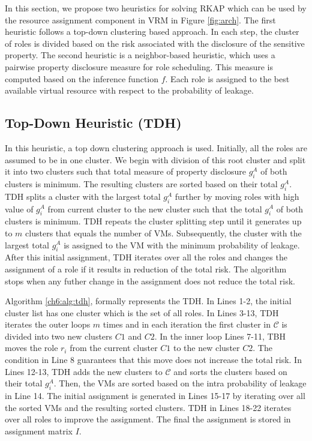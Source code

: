 In this section, we propose two heuristics for solving RKAP which can be used by the resource assignment component in VRM in Figure \ref{fig:arch}. The first heuristic follows a top-down clustering based approach. In each step, the cluster of roles is divided based on the risk associated with the disclosure of the sensitive property. The second heuristic is a neighbor-based heuristic, which uses a pairwise property disclosure measure for role scheduling. This measure is computed based on the inference function $f$. Each role is assigned to the best available virtual resource with respect to the probability of leakage.

\subsection{Top-Down Heuristic (TDH)}
In  this heuristic, a top down clustering approach is used. Initially, all the roles are assumed to be in one cluster. We begin with division of this root cluster and split it into two clusters such that total measure of property disclosure $g_i^A $ of both clusters is minimum. The resulting clusters are sorted based on their total $g_i^A$. TDH splits a cluster with the largest total $g_i^A$ further by moving roles with high value of $g_i^A$ from current cluster to the new cluster such that the total $g_i^A$ of both clusters is minimum. TDH repeats the cluster  splitting  step until it generates up to $m$ clusters that equals  the number of VMs. Subsequently, the cluster with the largest total $g_i^A$ is assigned to the VM with the minimum probability of leakage. After this initial assignment, TDH iterates over all the roles and changes the assignment of a role if it results in reduction of the total risk. The algorithm stops when any futher change in the assignment does not reduce the total  risk. 

 Algorithm \ref{ch6:alg:tdh}, formally represents the TDH. In Lines 1-2,  the initial cluster list has one cluster which is the set of all roles. In Lines 3-13,  TDH iterates the outer loops $m$ times and in each iteration the first cluster in  $\mathcal{C}$ is divided  into two new clusters $C1$ and $C2$. In the inner loop Lines 7-11, TBH moves the role $r_i$ from the current cluster $C1$ to the new cluster $C2$. The condition in Line 8 guarantees that this move does not increase the total  risk.  In Lines 12-13, TDH adds the new clusters to $\mathcal{C}$ and sorts the clusters based on  their  total $g_i^A$. Then,  the VMs  are sorted based on the intra probability of leakage in Line 14. The initial assignment is generated in Lines 15-17 by iterating over all the sorted VMs and the resulting sorted clusters.  TDH in Lines 18-22 iterates over all roles to improve the assignment. The final the assignment is stored in assignment matrix $I$.

